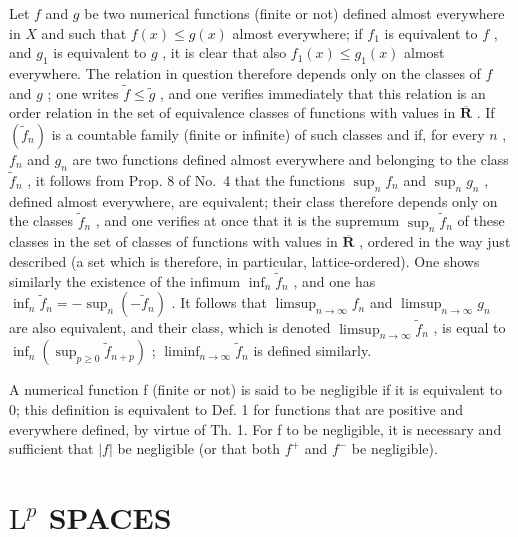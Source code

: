 Let \(f\) and \(g\) be two numerical functions (finite or not) defined almost everywhere in \(X\) and such that \(f(x) \leqslant g(x)\) almost everywhere; if \(f_1\) is equivalent to \(f\) , and \(g_1\) is equivalent to \(g\) , it is clear that also \(f_1(x) \leqslant g_1(x)\) almost everywhere. The relation in question therefore depends only on the classes of \(f\) and \(g\) ; one writes \(\widetilde{f} \leqslant \widetilde{g}\) , and one verifies immediately that this relation is an order relation in the set of equivalence classes of functions with values in \(\overline{\mathbf{R}}\) . If \((\widetilde{f}_n)\) is a countable family (finite or infinite) of such classes and if, for every \(n\) , \(f_n\) and \(g_n\) are two functions defined almost everywhere and belonging to the class \(\widetilde{f}_n\) , it follows from Prop. 8 of No.~4 that the functions \(\sup_n f_n\) and \(\sup_n g_n\) , defined almost everywhere, are equivalent; their class therefore depends only on the classes \(\widetilde{f}_n\) , and one verifies at once that it is the supremum \(\sup_n \widetilde{f}_n\) of these classes in the set of classes of functions with values in \(\overline{\mathbf{R}}\) , ordered in the way just described (a set which is therefore, in particular, lattice-ordered). One shows similarly the existence of the infimum \(\inf_n \widetilde{f}_n\) , and one has \(\inf_n \widetilde{f}_n = -\sup_n (-\widetilde{f}_n)\) . It follows that \(\limsup_{n \to \infty} f_n\) and \(\limsup_{n \to \infty} g_n\) are also equivalent, and their class, which is denoted \(\limsup_{n \to \infty} \widetilde{f}_n\) , is equal to \(\inf_n (\sup_{p \geqslant 0} \widetilde{f}_{n+p})\) ; \(\liminf_{n \to \infty} \widetilde{f}_n\) is defined similarly.

A numerical function f (finite or not) is said to be negligible if it is equivalent to 0; this definition is equivalent to Def. 1 for functions that are positive and everywhere defined, by virtue of Th. 1. For f to be negligible, it is necessary and sufficient that \(|f|\) be negligible (or that both \(f^{+}\) and \(f^{-}\) be negligible).

\section{\texorpdfstring{\(\mathrm{L}^{p}\) SPACES}{L to the p spaces}}
